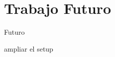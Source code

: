  \section{Trabajo Futuro}
	
\begin{frame}{Futuro}
	\begin{block}{}
	ampliar el setup
	\end{block}
\end{frame}